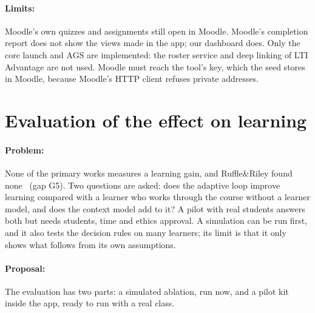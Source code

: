 \paragraph{Limits:} Moodle's own quizzes and assignments still open in
Moodle. Moodle's completion report does not show the views made in the
app; our dashboard does. Only the core launch and AGS are implemented:
the roster service and deep linking of LTI Advantage are not used. Moodle
must reach the tool's key, which the seed stores in Moodle, because
Moodle's HTTP client refuses private addresses.

\section{Evaluation of the effect on learning}
\label{sec-c-eval}

\paragraph{Problem:} None of the primary works measures a learning gain,
and Ruffle\&Riley found none~\cite{schmucker2024ruffle} (gap G5). Two
questions are asked: does the adaptive loop improve learning compared with
a learner who works through the course without a learner model, and does
the context model add to it? A pilot with real students answers both but
needs students, time and ethics approval. A simulation can be run first,
and it also tests the decision rules on many learners; its limit is that
it only shows what follows from its own assumptions.

\paragraph{Proposal:} The evaluation has two parts: a simulated ablation,
run now, and a pilot kit inside the app, ready to run with a real class.

